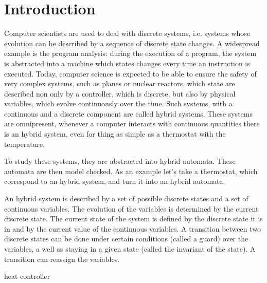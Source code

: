 \section{Introduction}
Computer scientists are used to deal with discrete systems, i.e. systems whose evolution can be described by a sequence of discrete state changes. A widespread example is the program analysis: during the execution of a program, the system is abstracted into a machine which states changes every time an instruction is executed.
Today, computer science is expected to be able to ensure the safety of very complex systems, such as planes or nuclear reactors, which state are described non only by a controller, which is discrete, but also by physical variables, which evolve continuously over the time. Such systems, with a continuous and a discrete component are called hybrid systems. These systems are omnipresent, whenever a computer interacts with continuous quantities there is an hybrid system, even for thing as simple as a thermostat with the temperature.


To study these systems, they are abstracted into hybrid automata. These automata are then model checked. As an example let's take a thermostat, which correspond to an hybrid system, and turn it into an hybrid automata.

An hybrid system is described by a set of possible discrete states and a set of continuous variables. The evolution of the variables is determined by the current discrete state. The current state of the system is defined by the discrete state it is in and by the current value of the continuous variables. A transition between two discrete states can be done under certain conditions (called a guard) over the variables, a well as staying in a given state (called the invariant of the state). A transition can reassign the variables.  

\begin{example} heat controller
\end{example}

